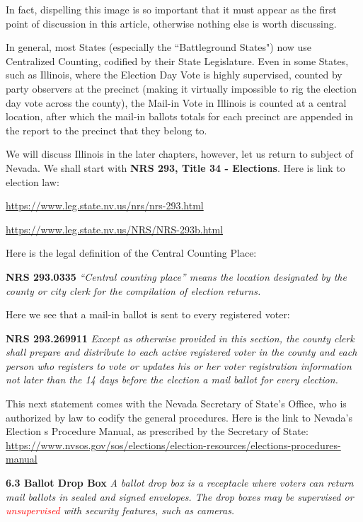 In fact, dispelling this image is so important that it must appear as the first point of discussion in this article, otherwise nothing else is worth discussing.

In general, most States (especially the ``Battleground States") now use Centralized Counting, codified by their State Legislature. Even in some States, such as Illinois, where the Election Day Vote is highly supervised, counted by party observers at the precinct (making it virtually impossible to rig the election day vote across the county), the Mail-in Vote in Illinois is counted at a central location, after which the mail-in ballots totals for each precinct are appended in the report to the precinct that they belong to.

We will discuss Illinois in the later chapters, however, let us return to subject of Nevada. We shall start with \textbf{NRS 293, Title 34 - Elections}. Here is link to election law: 

\url{https://www.leg.state.nv.us/nrs/nrs-293.html}

\url{https://www.leg.state.nv.us/NRS/NRS-293b.html}

Here is the legal definition of the Central Counting Place:

\textbf{NRS 293.0335} \textit{``Central counting place” means the location designated by the county or city clerk for the compilation of election returns.}

Here we see that a mail-in ballot is sent to every registered voter:

\textbf{NRS 293.269911} \textit{Except as otherwise provided in this section, the county clerk shall prepare and distribute to each active registered voter in the county and each person who registers to vote or updates his or her voter registration information not later than the 14 days before the election a mail ballot for every election.}

This next statement comes with the Nevada Secretary of State's Office, who is authorized by law to codify the general procedures. Here is the link to Nevada's Election s Procedure Manual, as prescribed by the Secretary of State: \url{https://www.nvsos.gov/sos/elections/election-resources/elections-procedures-manual}

\textbf{6.3 Ballot Drop Box} \textit{A ballot drop box is a receptacle where voters can return mail ballots in sealed and signed envelopes. The drop
boxes may be supervised or \textcolor{red}{unsupervised} with security features, such as cameras.}

